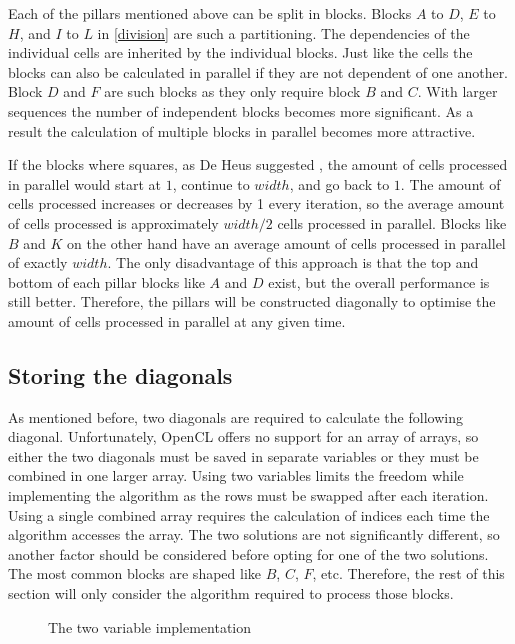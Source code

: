 Each of the pillars mentioned above can be split in blocks.
Blocks $A$ to $D$, $E$ to $H$, and $I$ to $L$ in \cref{division} are such a partitioning.
The dependencies of the individual cells are inherited by the individual blocks.
Just like the cells the blocks can also be calculated in parallel if they are not dependent of one another.
Block $D$ and $F$ are such blocks as they only require block $B$ and $C$.
With larger sequences the number of independent blocks becomes more significant.
As a result the calculation of multiple blocks in parallel becomes more attractive.

If the blocks where squares, as De Heus suggested \cite{Heus}, the amount of cells processed in parallel would start at $1$, continue to $width$, and go back to $1$.
The amount of cells processed increases or decreases by 1 every iteration, so the average amount of cells processed is approximately $width/2$ cells processed in parallel.
Blocks like $B$ and $K$ on the other hand have an average amount of cells processed in parallel of exactly $width$.
The only disadvantage of this approach is that the top and bottom of each pillar blocks like $A$ and $D$ exist, but the overall performance is still better.
Therefore, the pillars will be constructed diagonally to optimise the amount of cells processed in parallel at any given time.

\subsection{Storing the diagonals} \label{section:diagonal}
As mentioned before, two diagonals are required to calculate the following diagonal.
Unfortunately, OpenCL offers no support for an array of arrays, so either the two diagonals must be saved in separate variables or they must be combined in one larger array.
Using two variables limits the freedom while implementing the algorithm as the rows must be swapped after each iteration.
Using a single combined array requires the calculation of indices each time the algorithm accesses the array.
The two solutions are not significantly different, so another factor should be considered before opting for one of the two solutions.
The most common blocks are shaped like $B$, $C$, $F$, etc.
Therefore, the rest of this section will only consider the algorithm required to process those blocks.

\begin{figure}[p]
    \centering
    \subfloat[][Input]{\label{twovarsinput}}
    \subfloat[][Output]{\label{twovarsoutput}}
    \caption{The two variable implementation} \label{twovars}
\end{figure}

